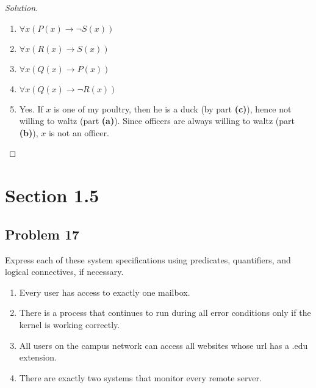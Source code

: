 \documentclass{article}
\newenvironment{solution}{\renewcommand\qedsymbol{}\begin{proof}[Solution]}{\end{proof}}
\begin{document}
\begin{solution}
\hspace{1pt}

\begin{enumerate}[leftmargin=16pt, topsep = 8pt]
\item $\forall x(P(x) \rightarrow \neg S(x))$
\item $\forall x(R(x) \rightarrow S(x))$
\item $\forall x(Q(x) \rightarrow P(x))$
\item $\forall x(Q(x) \rightarrow \neg R(x))$
\item Yes. If $x$ is one of my poultry, then he is a duck (by part \textbf{(c)}), hence not willing to waltz (part \textbf{(a)}). Since officers are always willing to waltz (part \textbf{(b)}), $x$ is not an officer.
\end{enumerate}
\end{solution}

\clearpage
\section*{Section 1.5}
\subsection*{Problem 17}
Express each of these system specifications using predicates, quantifiers, and logical connectives, if necessary.

\begin{enumerate}[leftmargin=16pt, topsep = 8pt]
\item Every user has access to exactly one mailbox.
\item There is a process that continues to run during all error conditions only if the kernel is working correctly.
\item All users on the campus network can access all websites whose url has a .edu extension.
\item There are exactly two systems that monitor every remote server.
\end{enumerate}
\end{document}

